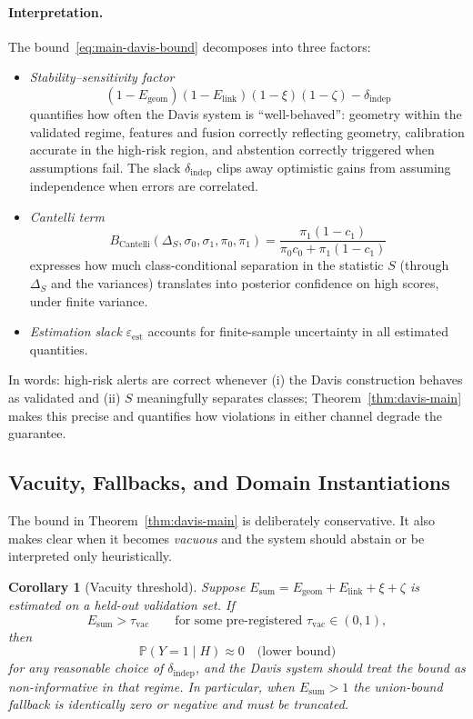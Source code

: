 \documentclass[11pt]{article}
\newcommand{\Prob}{\mathbb{P}}
\newtheorem{corollary}{Corollary}
\begin{document}
\paragraph{Interpretation.}
The bound~\eqref{eq:main-davis-bound} decomposes into three factors:
\begin{itemize}[leftmargin=2em]
  \item \emph{Stability–sensitivity factor}
    \[
    (1-E_{\mathrm{geom}})(1-E_{\mathrm{link}})(1-\xi)(1-\zeta) - \delta_{\mathrm{indep}}
    \]
    quantifies how often the Davis system is “well-behaved”: geometry within the validated
    regime, features and fusion correctly reflecting geometry, calibration accurate in the
    high-risk region, and abstention correctly triggered when assumptions fail. The slack
    $\delta_{\mathrm{indep}}$ clips away optimistic gains from assuming independence when errors
    are correlated.

  \item \emph{Cantelli term}
    \[
    B_{\mathrm{Cantelli}}(\Delta_S,\sigma_0,\sigma_1,\pi_0,\pi_1)
    =
    \frac{\pi_1 (1-c_1)}{\pi_0 c_0 + \pi_1 (1-c_1)}
    \]
    expresses how much class-conditional separation in the statistic $S$ (through $\Delta_S$ and
    the variances) translates into posterior confidence on high scores, under finite variance.

  \item \emph{Estimation slack} $\varepsilon_{\mathrm{est}}$ accounts for finite-sample uncertainty in
    all estimated quantities.
\end{itemize}
In words: high-risk alerts are correct whenever (i) the Davis construction behaves as validated
and (ii) $S$ meaningfully separates classes; Theorem~\ref{thm:davis-main} makes this precise and
quantifies how violations in either channel degrade the guarantee.

\subsection{Vacuity, Fallbacks, and Domain Instantiations}

The bound in Theorem~\ref{thm:davis-main} is deliberately conservative. It also makes clear when
it becomes \emph{vacuous} and the system should abstain or be interpreted only heuristically.

\begin{corollary}[Vacuity threshold]
\label{cor:vacuity}
Suppose $E_{\mathrm{sum}} = E_{\mathrm{geom}} + E_{\mathrm{link}} + \xi + \zeta$ is estimated on a held-out
validation set. If
\[
E_{\mathrm{sum}} > \tau_{\mathrm{vac}}
\qquad\text{for some pre-registered }\tau_{\mathrm{vac}} \in (0,1),
\]
then
\[
\Prob(Y=1 \mid H)
\approx 0 \quad\text{(lower bound)}
\]
for any reasonable choice of $\delta_{\mathrm{indep}}$, and the Davis system should treat the bound
as non-informative in that regime. In particular, when $E_{\mathrm{sum}} > 1$ the union-bound
fallback is identically zero or negative and must be truncated.
\end{corollary}
\end{document}
